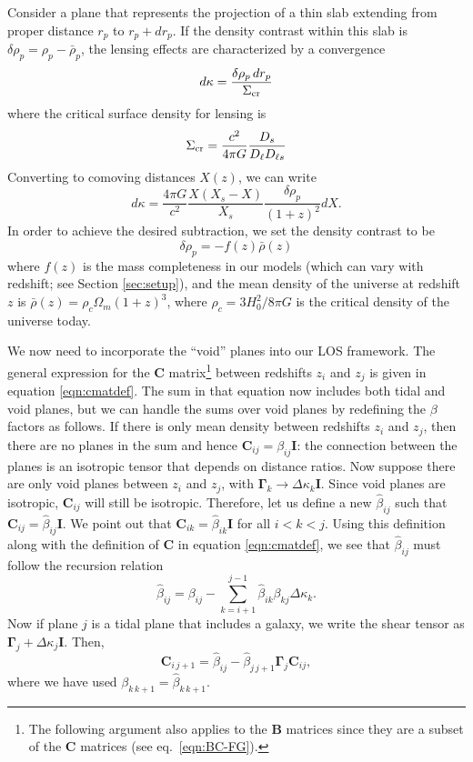 \documentclass{emulateapj}
\newcommand\B[0]{\mathbf{B}}
\newcommand\C[0]{\mathbf{C}}
\newcommand\I[0]{\mathbf{I}}
\newcommand\GammaMat[0]{\boldsymbol{\Gamma}}
\newcommand\drho{\delta\rho}
\newcommand\Sigcrit{\Sigma_{\rm{cr}}}
\newcommand\betahat{\hat{\beta}}
\begin{document}
Consider a plane that represents the projection of a thin slab extending from proper distance $r_p$ to $r_p+dr_p$.  If the density contrast within this slab is $\drho_p = \rho_p - \bar\rho_p$, the lensing effects are characterized by a convergence
\begin{equation}
  d\kappa = \frac{\drho_p\,dr_p}{\Sigcrit}
\end{equation}
where the critical surface density for lensing is
\begin{equation}
  \Sigcrit = \frac{c^2}{4 \pi G} \frac{D_s}{D_\ell D_{\ell s}}
\end{equation}
Converting to comoving distances $X(z)$, we can write
\begin{equation}\label{eqn:dkappa}
  d\kappa = \frac{4 \pi G}{c^2}\frac{X (X_s - X)}{X_s} \frac{\drho_p}{(1+z)^2} dX.
\end{equation}
In order to achieve the desired subtraction, we set the density contrast to be
\begin{equation}
  \drho_p = -f(z) \bar{\rho}(z) 
\end{equation}
where $f(z)$ is the mass completeness in our models (which can vary with redshift; see Section \ref{sec:setup}), and the mean density of the universe at redshift $z$ is $\bar{\rho}(z) = \rho_{c} \Omega_m (1 + z)^3$, where $\rho_{c} = 3 H_0^2 / 8 \pi G$ is the critical density of the universe today.

We now need to incorporate the ``void'' planes into our LOS framework.  The general expression for the $\C$ matrix\footnote{The following argument also applies to the $\B$ matrices since they are a subset of the $\C$ matrices (see eq.\ \ref{eqn:BC-FG}).} between redshifts $z_i$ and $z_j$ is given in equation \ref{eqn:cmatdef}. The sum in that equation now includes both tidal and void planes, but we can handle the sums over void planes by redefining the $\beta$ factors as follows.  If there is only mean density between redshifts $z_i$ and $z_j$, then there are no planes in the sum and hence $\C_{i j} = \beta_{i j } \I$: the connection between the planes is an isotropic tensor that depends on distance ratios. Now suppose there are only void planes between $z_i$ and $z_j$, with $\GammaMat_k \rightarrow \Delta \kappa_k \I$. Since void planes are isotropic, $\C_{i j}$ will still be isotropic. Therefore, let us define a new $\betahat_{i j}$ such that $\C_{i j} = \betahat_{i j} \I$. We point out that $\C_{i k } = \betahat_{i k} \I$ for all $i < k < j$. Using this definition along with the definition of $\C$ in equation \ref{eqn:cmatdef}, we see that $\betahat_{i j}$ must follow the recursion relation
\begin{equation}
\label{eqn:betahatdef}
\betahat_{i j}  = \beta_{i j} - \sum \limits_{k = i +1}^{j -1} \betahat_{i k} \beta_{k j} \Delta \kappa_k.
\end{equation}
Now if plane $j$ is a tidal plane that includes a galaxy, we write the shear tensor as $\GammaMat_j + \Delta \kappa_j \I$. Then,
\begin{equation}
\C_{i \, j +1} = \betahat_{i j}  - \betahat_{j \, j+1} \GammaMat_j \C_{i j},
\end{equation}
where we have used $\beta_{k \, k+1} = \betahat_{k\, k+1}$.
\end{document}
